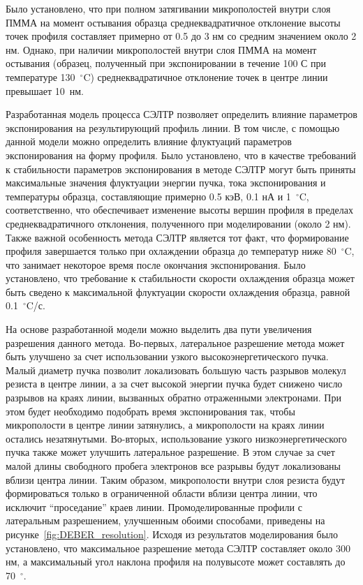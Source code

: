 Было установлено, что при полном затягивании микрополостей внутри слоя ПММА на момент остывания образца среднеквадратичное отклонение высоты точек профиля составляет примерно от 0.5 до 3 нм со средним значением около 2 нм. Однако, при наличии микрополостей внутри слоя ПММА на момент остывания (образец, полученный при экспонировании в течение 100 С при температуре 130~$^\circ$C) среднеквадратичное отклонение точек в центре линии превышает 10~нм.

Разработанная модель процесса СЭЛТР позволяет определить влияние параметров экспонирования на результирующий профиль линии. В том числе, с помощью данной модели можно определить влияние флуктуаций параметров экспонирования на форму профиля.
Было установлено, что в качестве требований к стабильности параметров экспонирования в методе СЭЛТР могут быть приняты максимальные значения флуктуации энергии пучка, тока экспонирования и температуры образца, составляющие примерно 0.5 кэВ, 0.1 нА и 1~$^\circ$C, соответственно, что обеспечивает изменение высоты вершин профиля в пределах среднеквадратичного отклонения, полученного при моделировании (около 2 нм). Также важной особенность метода СЭЛТР является тот факт, что формирование профиля завершается только при охлаждении образца до температур ниже 80~$^\circ$C, что занимает некоторое время после окончания экспонирования. Было установлено, что требование к стабильности скорости охлаждения образца может быть сведено к максимальной флуктуации скорости охлаждения образца, равной 0.1~$^\circ$C/с.

На основе разработанной модели можно выделить два пути увеличения разрешения данного метода. Во-первых, латеральное разрешение метода может быть улучшено за счет использовании узкого высокоэнергетического пучка. Малый диаметр пучка позволит локализовать большую часть разрывов молекул резиста в центре линии, а за счет высокой энергии пучка будет снижено число разрывов на краях линии, вызванных обратно отраженными электронами. При этом будет необходимо подобрать время экспонирования так, чтобы микрополости в центре линии затянулись, а микрополости на краях линии остались незатянутыми. Во-вторых, использование узкого низкоэнергетического пучка также может улучшить латеральное разрешение. В этом случае за счет малой длины свободного пробега электронов все разрывы будут локализованы вблизи центра линии. Таким образом, микрополости внутри слоя резиста будут формироваться только в ограниченной области вблизи центра линии, что исключит ``проседание'' краев линии. Промоделированные профили с латеральным разрешением, улучшенным обоими способами, приведены на рисунке~\ref{fig:DEBER_resolution}. Исходя из результатов моделирования было установлено, что максимальное разрешение метода СЭЛТР составляет около 300 нм, а максимальный угол наклона профиля на полувысоте может составлять до 70~$^\circ$.

